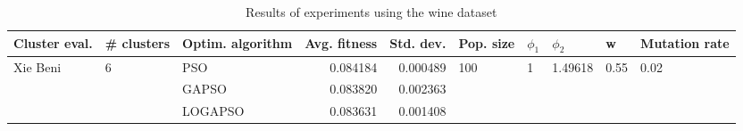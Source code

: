 \begin{table}
\centering
\caption{Results of experiments using the wine dataset}
\begin{tabular}{lllrrlllll}
\toprule
            Cluster eval. &        \# clusters & Optim. algorithm &  Avg. fitness &  Std. dev. &            Pop. size &         $\phi_{1}$ &               $\phi_{2}$ &                     w &         Mutation rate \\
\midrule
\multirow{3}{*}{Xie Beni} & \multirow{3}{*}{6} &              PSO &      0.084184 &   0.000489 & \multirow{3}{*}{100} & \multirow{3}{*}{1} & \multirow{3}{*}{1.49618} & \multirow{3}{*}{0.55} & \multirow{3}{*}{0.02} \\
                          &                    &            GAPSO &      0.083820 &   0.002363 &                      &                    &                          &                       &                       \\
                          &                    &          LOGAPSO &      0.083631 &   0.001408 &                      &                    &                          &                       &                       \\
\bottomrule
\end{tabular}
\end{table}
